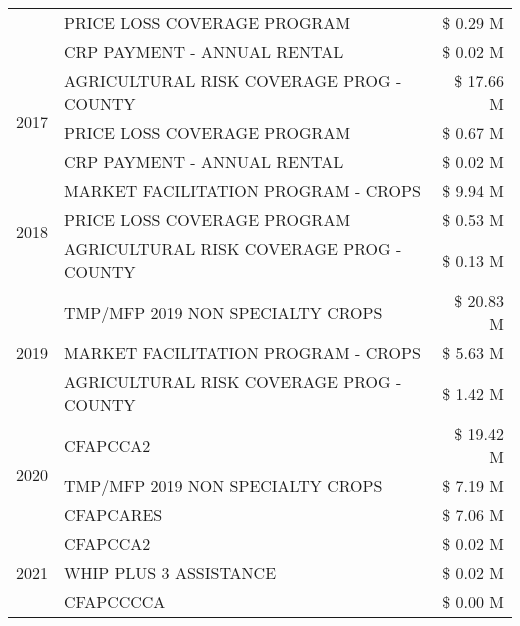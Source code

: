 \begin{tabular}{llr}
 & PRICE LOSS COVERAGE PROGRAM & \$ 0.29 M \\
 & CRP PAYMENT - ANNUAL RENTAL & \$ 0.02 M \\
\cline{1-3}
\multirow[t]{3}{*}{2017} & AGRICULTURAL RISK COVERAGE PROG - COUNTY & \$ 17.66 M \\
 & PRICE LOSS COVERAGE PROGRAM & \$ 0.67 M \\
 & CRP PAYMENT - ANNUAL RENTAL & \$ 0.02 M \\
\cline{1-3}
\multirow[t]{3}{*}{2018} & MARKET FACILITATION PROGRAM - CROPS & \$ 9.94 M \\
 & PRICE LOSS COVERAGE PROGRAM & \$ 0.53 M \\
 & AGRICULTURAL RISK COVERAGE PROG - COUNTY & \$ 0.13 M \\
\cline{1-3}
\multirow[t]{3}{*}{2019} & TMP/MFP 2019 NON SPECIALTY CROPS & \$ 20.83 M \\
 & MARKET FACILITATION PROGRAM - CROPS & \$ 5.63 M \\
 & AGRICULTURAL RISK COVERAGE PROG - COUNTY & \$ 1.42 M \\
\cline{1-3}
\multirow[t]{3}{*}{2020} & CFAPCCA2 & \$ 19.42 M \\
 & TMP/MFP 2019 NON SPECIALTY CROPS & \$ 7.19 M \\
 & CFAPCARES & \$ 7.06 M \\
\cline{1-3}
\multirow[t]{3}{*}{2021} & CFAPCCA2 & \$ 0.02 M \\
 & WHIP PLUS 3 ASSISTANCE & \$ 0.02 M \\
 & CFAPCCCCA & \$ 0.00 M \\
\cline{1-3}
\bottomrule
\end{tabular}
